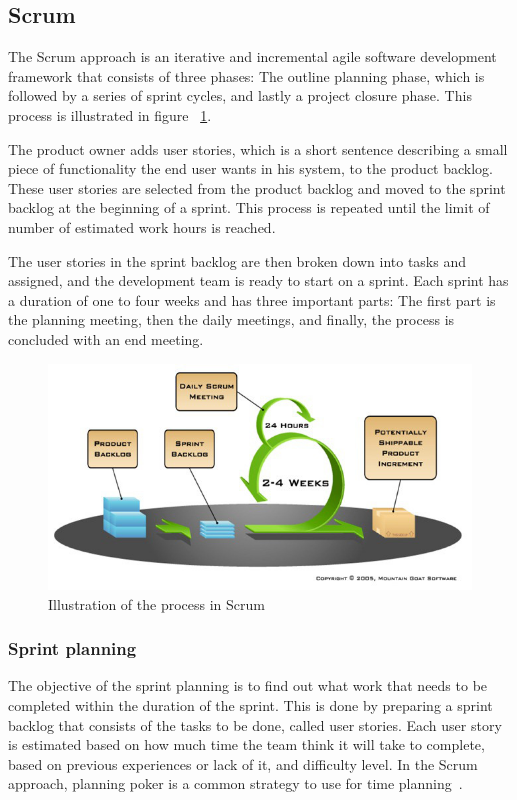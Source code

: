 \newpage
\subsection{Scrum}

\label{sec:scrumProjectManagement}

The Scrum approach is an iterative and incremental agile software development
framework that consists of three phases: The outline planning phase, which is
followed by a series of sprint cycles, and lastly a project closure phase. This process is illustrated in figure ~\ref{fig:scrumProcess}.

The product owner adds user stories, which is a short sentence describing a small piece of functionality the end user wants in his system, to the product backlog. These user stories are selected from the product backlog and moved to the sprint backlog at the beginning of a sprint. This process is repeated until the limit of number of estimated work hours is reached. 

The user stories in the sprint backlog are then broken down into tasks and assigned, and the development team is ready to start on a sprint. Each sprint has a duration of one to four weeks and has three important parts: The first part is the
planning meeting, then the daily  meetings, and finally, the process is
concluded with an end meeting. 
\begin{figure}[H]
\includegraphics[width=\textwidth]{ch/projectManagement/fig/sprintProcess.jpg}
\caption{Illustration of the process in Scrum}
\label{fig:scrumProcess}
\end{figure}


\subsubsection{Sprint planning}
\label{sec:sprintplanning}
The objective of the sprint planning is to find out what work that needs to be completed within the duration of the sprint. This is done by preparing a sprint backlog that consists of the tasks to be done, called user stories. Each user story is estimated based on how much time the team think it will take to complete, based on previous experiences or lack of it, and difficulty level. In the Scrum approach, planning poker is a common strategy to use for time planning~\cite{planningpoker}.

